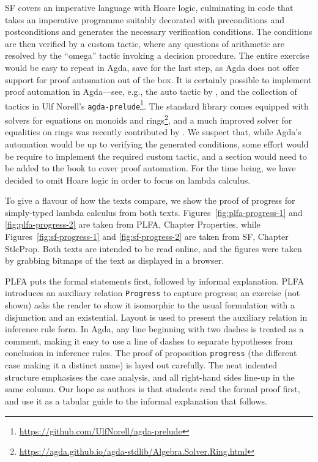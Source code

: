 \documentclass[preprint,authoryear]{elsarticle}
\begin{document}
SF covers an imperative language with Hoare logic, culminating in code that
takes an imperative programme suitably decorated with preconditions and
postconditions and generates the necessary verification conditions. The
conditions are then verified by a custom tactic, where any questions of
arithmetic are resolved by the ``omega'' tactic invoking a decision procedure.
The entire exercise would be easy to repeat in Agda, save for the last step, as
Agda does not offer support for proof automation out of the box. It is 
certainly possible to implement proof automation in Agda---see, e.g., the auto
tactic by \citet{Kokke-2015}, and the collection of tactics in Ulf Norell's
\texttt{agda-prelude}\footnote{\url{https://github.com/UlfNorell/agda-prelude}}.
The standard library comes equipped with solvers for equations on monoids and
rings\footnote{\url{https://agda.github.io/agda-stdlib/Algebra.Solver.Ring.html}},
and a much improved solver for equalities on rings was recently contributed by
\citet{Kidney-2019}.
We suspect that, while Agda's automation would be up to verifying the generated
conditions, some effort would be require to implement the required custom
tactic, and a section would need to be added to the book to cover proof
automation. For the time being, we have decided to omit Hoare logic in order to
focus on lambda calculus.

To give a flavour of how the texts compare, we show the
proof of progress for simply-typed lambda calculus from both texts.
Figures~\ref{fig:plfa-progress-1} and \ref{fig:plfa-progress-2}
are taken from PLFA, Chapter Properties,
while Figures~\ref{fig:sf-progress-1} and \ref{fig:sf-progress-2}
are taken from SF, Chapter StlcProp.
Both texts are intended to be read online,
and the figures were taken by grabbing bitmaps of the text as
displayed in a browser.

PLFA puts the formal statements first, followed by informal explanation.
PLFA introduces an auxiliary relation \texttt{Progress} to capture
progress; an exercise (not shown) asks the reader to show it isomorphic
to the usual formulation with a disjunction and an existential.
Layout is used to present the auxiliary relation in inference rule form.
In Agda, any line beginning with two dashes is treated as a comment, making
it easy to use a line of dashes to separate hypotheses from conclusion
in inference rules.  The proof of proposition \texttt{progress} (the different
case making it a distinct name) is layed out carefully. The neat
indented structure emphasises the case analysis, and all right-hand
sides line-up in the same column.  Our hope as authors is that students
read the formal proof first, and use it as a tabular guide
to the informal explanation that follows.
\end{document}
